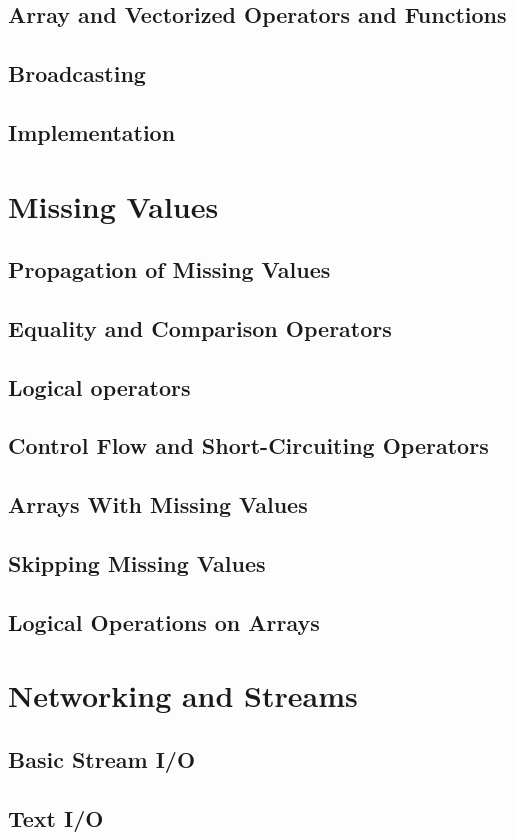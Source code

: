     \section{Array and Vectorized Operators and Functions}
    \section{Broadcasting}
    \section{Implementation}
  \chapter{Missing Values}
    \section{Propagation of Missing Values}
    \section{Equality and Comparison Operators}
    \section{Logical operators}
    \section{Control Flow and Short-Circuiting Operators}
    \section{Arrays With Missing Values}
    \section{Skipping Missing Values}
    \section{Logical Operations on Arrays}
  \chapter{Networking and Streams}
    \section{Basic Stream I/O}
    \section{Text I/O}
